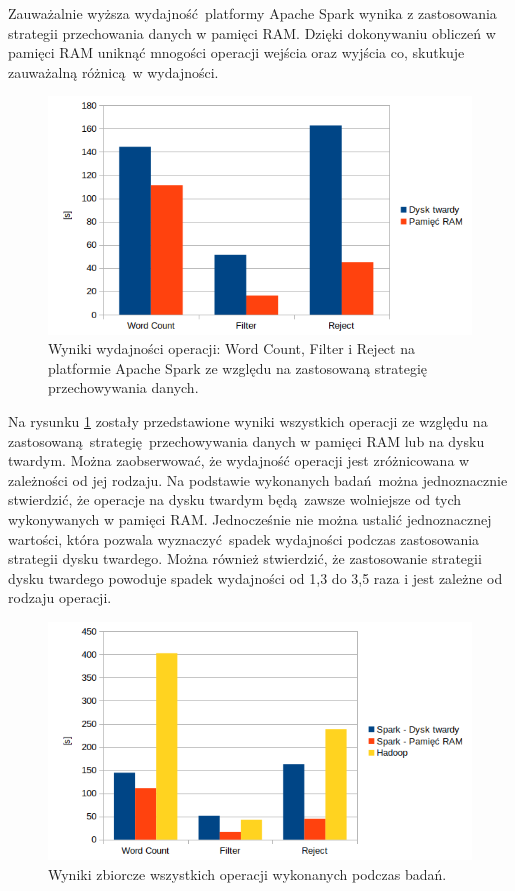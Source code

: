 Zauważalnie wyższa wydajność platformy Apache Spark wynika z zastosowania strategii przechowania danych w pamięci RAM. Dzięki dokonywaniu obliczeń w pamięci RAM uniknąć mnogości operacji wejścia oraz wyjścia co, skutkuje zauważalną różnicą w wydajności.
\begin{figure}[!htb]
	\centering
	\includegraphics[scale=0.6]{results-spark-strategy-comparison-bar.png}
	\caption{Wyniki wydajności operacji: Word Count, Filter i Reject na platformie Apache Spark ze względu na zastosowaną strategię przechowywania danych.}
	\label{fig:results-spark-strategy-comparison-bar}
\end{figure}
Na rysunku \ref{fig:results-spark-strategy-comparison-bar} zostały przedstawione wyniki wszystkich operacji ze względu na zastosowaną strategię przechowywania danych w pamięci RAM lub na dysku twardym. Można zaobserwować, że wydajność operacji jest zróżnicowana w zależności od jej rodzaju. Na podstawie wykonanych badań można jednoznacznie stwierdzić, że operacje na dysku twardym będą zawsze wolniejsze od tych wykonywanych w pamięci RAM. Jednocześnie nie można ustalić jednoznacznej wartości, która pozwala wyznaczyć spadek wydajności podczas zastosowania strategii dysku twardego. Można również stwierdzić, że zastosowanie strategii dysku twardego powoduje spadek wydajności od 1,3 do 3,5 raza i jest zależne od rodzaju operacji. 
\begin{figure}[!htb]
	\centering
	\includegraphics[scale=0.6]{results-comparison-bar-all.png}
	\caption{Wyniki zbiorcze wszystkich operacji wykonanych podczas badań.}
	\label{fig:results-comparison-bar-all}
\end{figure}
